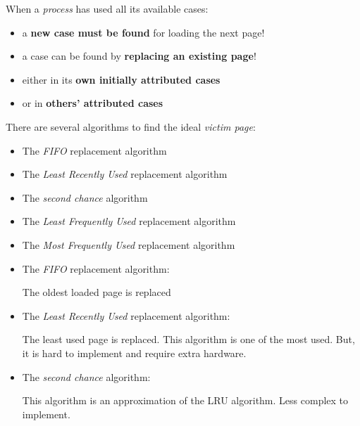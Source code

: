 \documentclass{beamer}[10pt, usepdftitle=false, handout]
\begin{document}
	\begin{frame}
		
	When a \textit{process} has used all its available cases:
	\vspace*{1em}
	\begin{itemize}
	\item{a \textbf{new case must be found} for loading the next page!}
	\item{a case can be found by \textbf{replacing an existing page}!}
	\item{either in its \textbf{own initially attributed cases}}
	\item{or in \textbf{others' attributed cases}}
	\end{itemize}
	\vspace*{1em}
	\pause
	There are several algorithms to find the ideal \textit{victim page}:
	\vspace*{1em}
	\begin{itemize}
	\item{The \textit{FIFO} replacement algorithm}
	\item{The \textit{Least Recently Used} replacement algorithm}
	\item{The \textit{second chance} algorithm}
	\item{The \textit{Least Frequently Used} replacement algorithm}
	\item{The \textit{Most Frequently Used} replacement algorithm} 
	\end{itemize}		
		
	
	\end{frame}		
	
	\begin{frame}
	
	\begin{itemize}
	\item{The \textit{FIFO} replacement algorithm:
	\vspace*{1em}
	
	The oldest loaded page is replaced 	
	\vspace*{1em}
	}
	\item{The \textit{Least Recently Used} replacement algorithm:
	\vspace*{1em}	
	
	The least used page is replaced. This algorithm is one of the most used. But, it is hard to implement and require extra hardware.
	\vspace*{1em}	
	}
	\item{The \textit{second chance} algorithm:
	\vspace*{1em}
	
	This algorithm is an approximation of the LRU algorithm. Less complex to implement.
	\vspace*{1em}	
	}
	\end{itemize}		
	
	\end{frame}
	
\end{document}

